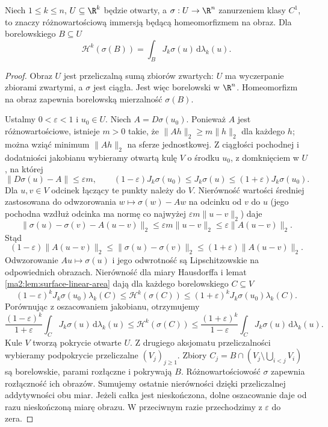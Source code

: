 \begin{twierdzenie}
\label{ma2:thm:surface-area}
Niech $1\le k\le n$, $U\subseteq\R^k$ będzie
otwarty, a $\sigma:U\to\R^n$ zanurzeniem klasy $C^1$,
to znaczy różnowartościową immersją będącą
homeomorfizmem na obraz. Dla borelowskiego $B\subseteq U$
\[
 \mathcal H^k(\sigma(B))=\int_B J_k\sigma(u)\,
 \mathrm d\lambda_k(u).
\]
\end{twierdzenie}
\begin{proof}
Obraz $U$ jest przeliczalną sumą zbiorów zwartych:
$U$ ma wyczerpanie zbiorami zwartymi, a $\sigma$
jest ciągła. Jest więc borelowski w $\R^n$.
Homeomorfizm na obraz zapewnia borelowską
mierzalność $\sigma(B)$.

Ustalmy $0<\varepsilon<1$ i $u_0\in U$.
Niech $A=D\sigma(u_0)$. Ponieważ $A$ jest
różnowartościowe, istnieje $m>0$ takie, że
$\|Ah\|_2\ge m\|h\|_2$ dla każdego $h$;
można wziąć minimum $\|Ah\|_2$ na sferze jednostkowej.
Z ciągłości pochodnej i dodatniości jakobianu
wybieramy otwartą kulę $V$ o środku $u_0$,
z domknięciem w $U$, na której
\[
 \|D\sigma(u)-A\|\le\varepsilon m,\qquad
 (1-\varepsilon)J_k\sigma(u_0)\le J_k\sigma(u)
 \le(1+\varepsilon)J_k\sigma(u_0).
\]
Dla $u,v\in V$ odcinek łączący te punkty należy do $V$.
Nierówność wartości średniej zastosowana do
odwzorowania $w\mapsto\sigma(w)-Aw$ na odcinku
od $v$ do $u$ (jego pochodna wzdłuż odcinka ma
normę co najwyżej $\varepsilon m\|u-v\|_2$) daje
\[
 \|\sigma(u)-\sigma(v)-A(u-v)\|_2
 \le\varepsilon m\|u-v\|_2
 \le\varepsilon\|A(u-v)\|_2.
\]
Stąd
\[
 (1-\varepsilon)\|A(u-v)\|_2
 \le\|\sigma(u)-\sigma(v)\|_2
 \le(1+\varepsilon)\|A(u-v)\|_2.
\]
Odwzorowanie $Au\mapsto\sigma(u)$ i jego odwrotność
są Lipschitzowskie na odpowiednich obrazach.
Nierówność dla miary Hausdorffa i
lemat \ref{ma2:lem:surface-linear-area} dają
dla każdego borelowskiego $C\subseteq V$
\[
 (1-\varepsilon)^kJ_k\sigma(u_0)\lambda_k(C)
 \le\mathcal H^k(\sigma(C))
 \le(1+\varepsilon)^kJ_k\sigma(u_0)\lambda_k(C).
\]
Porównując z oszacowaniem jakobianu, otrzymujemy
\[
 \frac{(1-\varepsilon)^k}{1+\varepsilon}
 \int_C J_k\sigma(u)\,\mathrm d\lambda_k(u)
 \le\mathcal H^k(\sigma(C))
 \le\frac{(1+\varepsilon)^k}{1-\varepsilon}
 \int_C J_k\sigma(u)\,\mathrm d\lambda_k(u).
\]
Kule $V$ tworzą pokrycie otwarte $U$.
Z drugiego aksjomatu przeliczalności wybieramy
podpokrycie przeliczalne $(V_j)_{j\ge1}$.
Zbiory $C_j=B\cap(V_j\setminus\bigcup_{i<j}V_i)$
są borelowskie, parami rozłączne i pokrywają $B$.
Różnowartościowość $\sigma$ zapewnia rozłączność
ich obrazów. Sumujemy ostatnie nierówności dzięki
przeliczalnej addytywności obu miar. Jeżeli całka
jest nieskończona, dolne oszacowanie daje od razu
nieskończoną miarę obrazu. W przeciwnym razie
przechodzimy z $\varepsilon$ do zera.
\end{proof}

